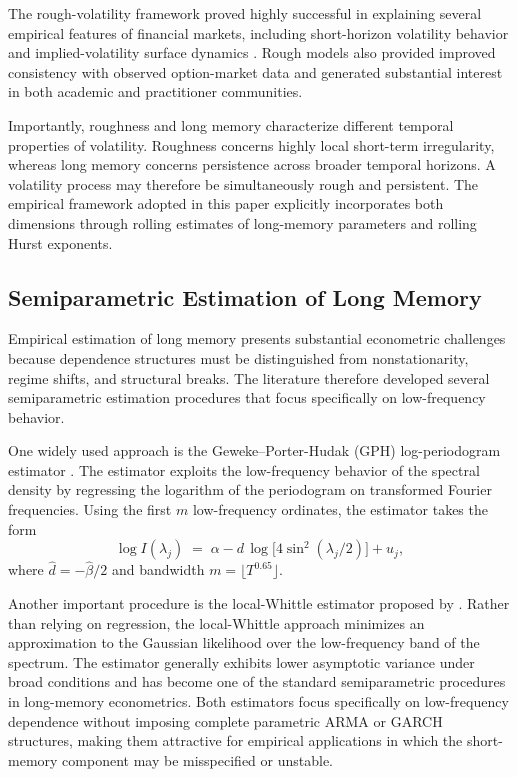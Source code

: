 \documentclass[unnumsec,webpdf,contemporary,large]{oup-authoring-template}%
\theoremstyle{thmstyleone}%
\theoremstyle{thmstyletwo}%
\theoremstyle{thmstylethree}%
\begin{document}
The rough-volatility framework proved highly successful in explaining
several empirical features of financial markets, including short-horizon
volatility behavior and implied-volatility surface dynamics
\citep{bennedsen2021decoupling}. Rough models also provided improved
consistency with observed option-market data and generated substantial
interest in both academic and practitioner communities.

Importantly, roughness and long memory characterize different temporal
properties of volatility. Roughness concerns highly local short-term
irregularity, whereas long memory concerns persistence across broader
temporal horizons. A volatility process may therefore be simultaneously
rough and persistent. The empirical framework adopted in this paper
explicitly incorporates both dimensions through rolling estimates of
long-memory parameters and rolling Hurst exponents.

\subsection{Semiparametric Estimation of Long Memory}

Empirical estimation of long memory presents substantial econometric
challenges because dependence structures must be distinguished from
nonstationarity, regime shifts, and structural breaks. The literature
therefore developed several semiparametric estimation procedures that focus
specifically on low-frequency behavior.

One widely used approach is the Geweke--Porter-Hudak (GPH)
log-periodogram estimator \citep{geweke1983estimation}. The estimator
exploits the low-frequency behavior of the spectral density by regressing
the logarithm of the periodogram on transformed Fourier frequencies. Using
the first $m$ low-frequency ordinates, the estimator takes the form
\begin{equation}
  \log I(\lambda_j) \;=\; \alpha
  - d\,\log\bigl[4\sin^2(\lambda_j/2)\bigr] + u_j,
\end{equation}
where $ \hat{d} = -\hat\beta/2$ and bandwidth $m = \lfloor T^{0.65}\rfloor$.

Another important procedure is the local-Whittle estimator proposed by
\citet{robinson1995gaussian}. Rather than relying on regression, the
local-Whittle approach minimizes an approximation to the Gaussian likelihood
over the low-frequency band of the spectrum. The estimator generally
exhibits lower asymptotic variance under broad conditions and has become one
of the standard semiparametric procedures in long-memory econometrics. Both
estimators focus specifically on low-frequency dependence without imposing
complete parametric ARMA or GARCH structures, making them attractive for
empirical applications in which the short-memory component may be
misspecified or unstable.
\end{document}
